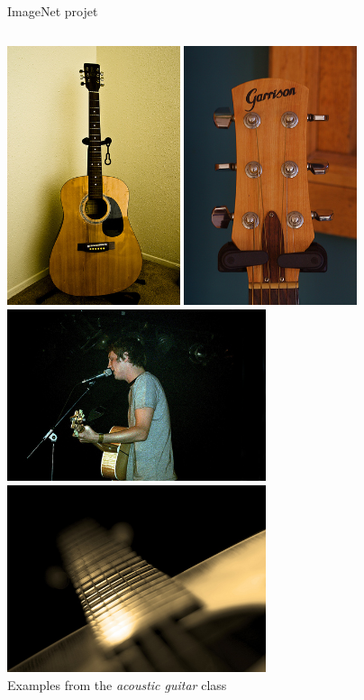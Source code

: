 \documentclass[xcolor=pdftex,dvipsnames,table,mathserif]{beamer}
\begin{document}
\begin{frame}{ImageNet projet}

\begin{columns}
  \begin{column}{.5\textwidth}
\centering
  \includegraphics[width=0.38\textwidth]{ilsvrc_guitar2}\hspace{0.1em}
  \includegraphics[width=0.38\textwidth]{ilsvrc_guitar3}\\
  \includegraphics[width=0.57\textwidth]{ilsvrc_guitar1}\\
  \includegraphics[width=0.57\textwidth]{ilsvrc_guitar4}\\
  Examples from the \emph{acoustic guitar} class


\end{column}
\end{columns}
\end{frame}
\end{document}

